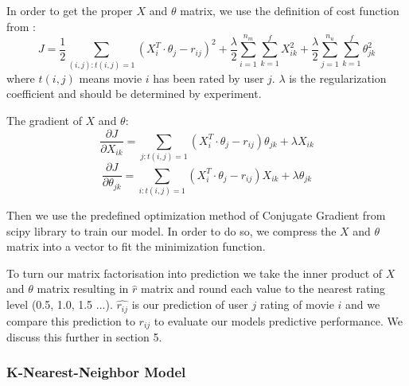 \documentclass[12pt]{article}
\begin{document}
In order to get the proper $X$ and $\theta$ matrix, we use the definition of cost function from \cite{MF}:
$$J = \frac{1}{2}\sum_{(i,j):t(i,j)=1}(X_i^T \cdot \theta_j - r_{ij})^2+\frac{\lambda}{2}\sum_{i = 1}^{n_m}\sum_{k = 1}^{f}X_{ik}^{2}+\frac{\lambda}{2}\sum_{j = 1}^{n_u}\sum_{k = 1}^{f}\theta_{jk}^{2}$$
where $t(i,j)$ means movie $i$ has been rated by user $j$. $\lambda$ is the regularization coefficient and should be determined by experiment.

The gradient of $X$ and $\theta$:
$$\frac{\partial J}{\partial X_{ik}} = \sum_{j:t(i,j)=1}(X_i^T \cdot \theta_j - r_{ij})\theta_{jk}+\lambda X_{ik}$$
$$\frac{\partial J}{\partial \theta_{jk}} = \sum_{i:t(i,j)=1}(X_i^T \cdot \theta_j - r_{ij})X_{ik}+\lambda \theta_{jk}$$

Then we use the predefined optimization method of Conjugate Gradient from scipy library to train our model. In order to do so, we compress the $X$ and $\theta$ matrix into a vector to fit the minimization function.

To turn our matrix factorisation into prediction we take the inner product of $X$ and $\theta$ matrix resulting in $\hat{r}$ matrix and round each value to the nearest rating level (0.5, 1.0, 1.5 ...). $\hat{r_{ij}}$ is our prediction of user $j$ rating of movie $i$ and we compare this prediction to $r_{ij}$ to evaluate our models predictive performance. We discuss this further in section 5.

\subsubsection{K-Nearest-Neighbor Model}
\end{document}
